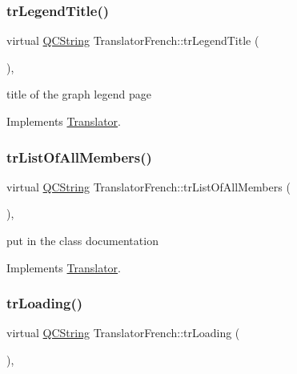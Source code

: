 \subsubsection{\texorpdfstring{trLegendTitle()}{trLegendTitle()}}
{\footnotesize\ttfamily virtual \mbox{\hyperlink{class_q_c_string}{Q\+C\+String}} Translator\+French\+::tr\+Legend\+Title (\begin{DoxyParamCaption}{ }\end{DoxyParamCaption})\hspace{0.3cm}{\ttfamily [inline]}, {\ttfamily [virtual]}}

title of the graph legend page 

Implements \mbox{\hyperlink{class_translator}{Translator}}.

\mbox{\label{class_translator_french_aa02f7e9afe41fee8304f62956ed2b334}} 
\subsubsection{\texorpdfstring{trListOfAllMembers()}{trListOfAllMembers()}}
{\footnotesize\ttfamily virtual \mbox{\hyperlink{class_q_c_string}{Q\+C\+String}} Translator\+French\+::tr\+List\+Of\+All\+Members (\begin{DoxyParamCaption}{ }\end{DoxyParamCaption})\hspace{0.3cm}{\ttfamily [inline]}, {\ttfamily [virtual]}}

put in the class documentation 

Implements \mbox{\hyperlink{class_translator}{Translator}}.

\mbox{\label{class_translator_french_ae11ebe7754cd66d4295b35f69188fccb}} 
\subsubsection{\texorpdfstring{trLoading()}{trLoading()}}
{\footnotesize\ttfamily virtual \mbox{\hyperlink{class_q_c_string}{Q\+C\+String}} Translator\+French\+::tr\+Loading (\begin{DoxyParamCaption}{ }\end{DoxyParamCaption})\hspace{0.3cm}{\ttfamily [inline]}, {\ttfamily [virtual]}}

